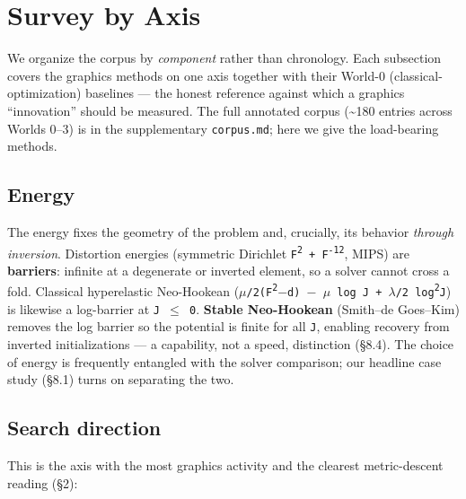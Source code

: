 \documentclass{egpubl}
\begin{document}
\section{Survey by Axis}

We organize the corpus by \emph{component} rather than chronology. Each subsection covers the graphics
methods on one axis together with their World-0 (classical-optimization) baselines --- the honest
reference against which a graphics ``innovation'' should be measured. The full annotated corpus (\textasciitilde{}180
entries across Worlds 0--3) is in the supplementary \texttt{corpus.md}; here we give the load-bearing methods.

\subsection{Energy}

The energy fixes the geometry of the problem and, crucially, its behavior \emph{through inversion}.
Distortion energies (symmetric Dirichlet \texttt{\textbar\textbar F\textbar\textbar \textsuperscript{2} + \textbar\textbar F\textsuperscript{-1}\textbar\textbar \textsuperscript{2}}, MIPS) are \textbf{barriers}: infinite at a
degenerate or inverted element, so a solver cannot cross a fold. Classical hyperelastic Neo-Hookean
(\texttt{$\mu$/2(\textbar\textbar F\textbar\textbar \textsuperscript{2}$-$d) $-$ $\mu$ log J + $\lambda$/2 log\textsuperscript{2}J}) is likewise a log-barrier at \texttt{J $\le$ 0}. \textbf{Stable Neo-Hookean}
(Smith--de Goes--Kim) \cite{stable-neo-hookean} removes the log barrier so the potential is finite for all \texttt{J}, enabling recovery
from inverted initializations --- a capability, not a speed, distinction (\S8.4). The choice of energy is
frequently entangled with the solver comparison; our headline case study (\S8.1) turns on separating
the two.

\subsection{Search direction}

This is the axis with the most graphics activity and the clearest metric-descent reading (\S2):
\end{document}
